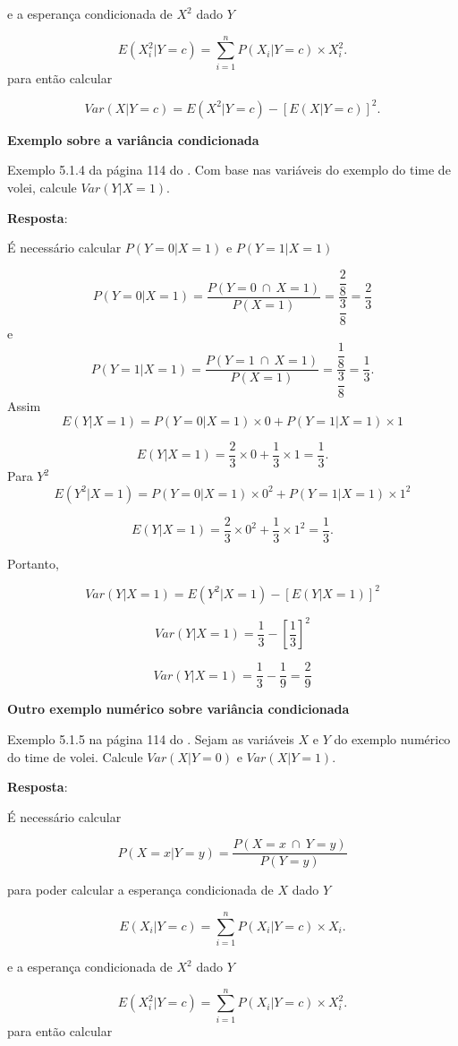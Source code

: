 \documentclass[
]{book}
\begin{document}
e a esperança condicionada de \(X^2\) dado \(Y\)

\[
  E(X_i^2|Y=c) = \sum_{i=1}^{n} P(X_i| Y=c) \times X_i^2.
\]
para então calcular

\[
  Var(X|Y=c) = E(X^2|Y=c) - [E(X|Y=c)]^2.
\]

\textbf{Exemplo sobre a variância condicionada}

Exemplo 5.1.4 da página 114 do \citet{Sartoris2013}. Com base nas variáveis do exemplo do time de volei, calcule \(Var(Y|X=1)\).

\textbf{Resposta}:

É necessário calcular \(P(Y=0|X=1)\) e \(P(Y=1|X=1)\)

\[
  P(Y=0|X=1) = \dfrac{P(Y=0~\cap~X=1)}{P(X=1)} = \dfrac{\dfrac{2}{8}}{\dfrac{3}{8}}=\dfrac{2}{3}
\]
e
\[
  P(Y=1|X=1) = \dfrac{P(Y=1~\cap~X=1)}{P(X=1)} = \dfrac{\dfrac{1}{8}}{\dfrac{3}{8}}=\dfrac{1}{3}.
\]
Assim
\[
  E(Y|X=1) = P(Y=0|X=1) \times 0 + P(Y=1|X=1) \times 1
\]

\[
  E(Y|X=1) = \dfrac{2}{3} \times 0 + \dfrac{1}{3} \times 1 = \dfrac{1}{3}.
\]
Para \(Y^2\)
\[
  E(Y^2|X=1) = P(Y=0|X=1) \times 0^2 + P(Y=1|X=1) \times 1^2
\]

\[
  E(Y|X=1) = \dfrac{2}{3} \times 0^2 + \dfrac{1}{3} \times 1^2 = \dfrac{1}{3}.
\]

Portanto,

\[
  Var(Y|X=1) = E(Y^2|X=1) - [E(Y|X=1)]^2
\]

\[
  Var(Y|X=1) = \dfrac{1}{3} - [\dfrac{1}{3}]^2 
\]

\[
  Var(Y|X=1) = \dfrac{1}{3} - \dfrac{1}{9} = \dfrac{2}{9} 
\]

\textbf{Outro exemplo numérico sobre variância condicionada}

Exemplo 5.1.5 na página 114 do \citet{Sartoris2013}. Sejam as variáveis \(X\) e \(Y\) do exemplo numérico do time de volei. Calcule \(Var(X|Y=0)\) e \(Var(X|Y=1)\).

\textbf{Resposta}:

É necessário calcular

\[
  P(X=x|Y=y) = \dfrac{P (X=x~\cap~Y=y)}{P(Y=y)}
\]

para poder calcular a esperança condicionada de \(X\) dado \(Y\)

\[
  E(X_i|Y=c) = \sum_{i=1}^{n} P(X_i| Y=c) \times X_i.
\]

e a esperança condicionada de \(X^2\) dado \(Y\)

\[
  E(X_i^2|Y=c) = \sum_{i=1}^{n} P(X_i| Y=c) \times X_i^2.
\]
para então calcular
\end{document}
